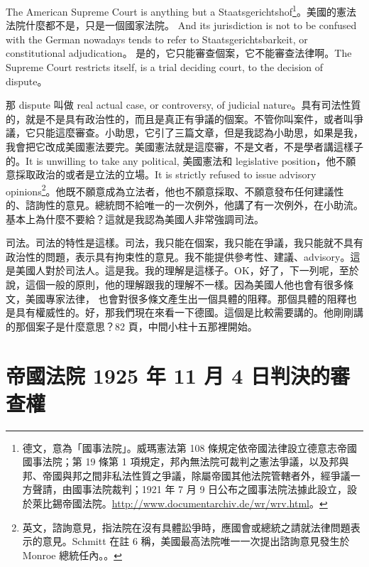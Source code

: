 \hypertarget{w05:cue:279}{}The American Supreme Court is anything but a Staatsgerichtshof\footnote{德文，意為「國事法院」。威瑪憲法第 108 條規定依帝國法律設立德意志帝國國事法院；第 19 條第 1 項規定，邦內無法院可裁判之憲法爭議，以及邦與邦、帝國與邦之間非私法性質之爭議，除屬帝國其他法院管轄者外，經爭議一方聲請，由國事法院裁判；1921 年 7 月 9 日公布之國事法院法據此設立，設於萊比錫帝國法院。\url{http://www.documentarchiv.de/wr/wrv.html}。}。美國的憲法法院什麼都不是，只是一個國家法院。
\hypertarget{w05:cue:280}{}And its jurisdiction is not to be confused with the German nowadays tends to refer to Staatsgerichtsbarkeit, or constitutional adjudication。
\hypertarget{w05:cue:281}{}是的，它只能審查個案，它不能審查法律啊。The Supreme Court restricts itself, is a trial deciding court, to the decision of dispute。

\hypertarget{w05:cue:282}{}那 dispute 叫做 real actual case, or controversy, of judicial nature。具有司法性質的，就是不是具有政治性的，而且是真正有爭議的個案。不管你叫案件，或者叫爭議，它只能這麼審查。小助思，它引了三篇文章，但是我認為小助思，如果是我，我會把它改成美國憲法要完。美國憲法就是這麼審，不是文者，不是學者講這樣子的。It is unwilling to take any political,
\hypertarget{w05:cue:283}{}美國憲法和 legislative position，他不願意採取政治的或者是立法的立場。It is strictly refused to issue advisory opinions\footnote{英文，諮詢意見，指法院在沒有具體訟爭時，應國會或總統之請就法律問題表示的意見。Schmitt 在註 6 稱，美國最高法院唯一一次提出諮詢意見發生於 Monroe 總統任內。\cite[81]{schmitt2015}。}。他既不願意成為立法者，他也不願意採取、不願意發布任何建議性的、諮詢性的意見。總統問不給唯一的一次例外，他講了有一次例外，在小助流。基本上為什麼不要給？這就是我認為美國人非常強調司法。

\hypertarget{w05:cue:284}{}司法。司法的特性是這樣。司法，我只能在個案，我只能在爭議，我只能就不具有政治性的問題，表示具有拘束性的意見。我不能提供參考性、建議、advisory。這是美國人對於司法人。這是我。我的理解是這樣子。OK，好了，下一列呢，至於說，這個一般的原則，他的理解跟我的理解不一樣。因為美國人他也會有很多條文，美國專家法律，
\hypertarget{w05:cue:285}{}也會對很多條文產生出一個具體的阻釋。那個具體的阻釋也是具有權威性的。好，那我們現在來看一下德國。這個是比較需要講的。他剛剛講的那個案子是什麼意思？82 頁，中間小柱十五那裡開始。

\section{帝國法院 1925 年 11 月 4 日判決的審查權}

